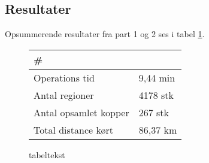 \subsection{Resultater}

Opsummerende resultater fra part 1 og 2 ses i tabel \ref{tb:resultater}. 

\begin{figure}[th!]
\centering
\begin{tabular}{l|l}
\# & \\\hline
Operations tid & 9,44 min \\
Antal regioner & 4178 stk\\
Antal opsamlet kopper & 267 stk\\
Total distance kørt & 86,37 km
\end{tabular}
\captionsetup{type=table}
\caption[tekst i indholdsfortegnelsen]{tabeltekst}
\label{tb:resultater}
\end{figure}






















